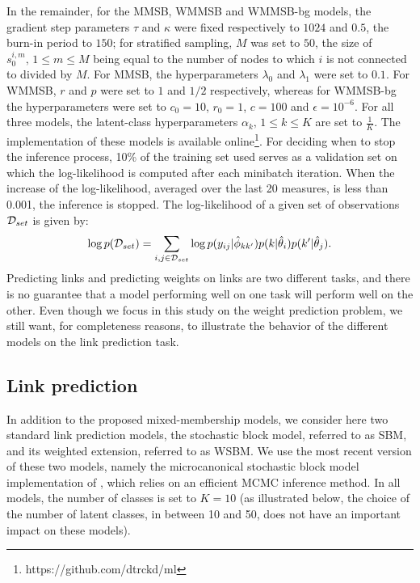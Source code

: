 In the remainder, for the MMSB, WMMSB and WMMSB-bg models, the gradient step parameters  $\tau$ and $\kappa$ were fixed respectively to  $1024$ and $0.5$, the burn-in period to $150$; for stratified sampling, $M$ was set to $50$, the size of $s_0^{i,m}, \, 1 \le m \le M$ being equal to the number of nodes to which $i$ is not connected to divided by $M$. For MMSB, the hyperparameters $\lambda_0$ and $\lambda_1$ were set to $0.1$. For WMMSB, $r$ and $p$ were set to $1$ and $1/2$ respectively, whereas for WMMSB-bg the hyperparameters were set to  $c_0=10$, $r_0=1$, $c=100$ and $\epsilon=10^{-6}$. For all three models, the latent-class hyperparameters $\alpha_k, \, 1 \le k \le K$ are set to $\frac{1}{K}$. The implementation of these models is available online\footnote{https://github.com/dtrckd/ml}. For deciding when to stop the inference process, 10\% of the training set used serves as a validation set on which the log-likelihood is computed after each minibatch iteration. When the increase of the log-likelihood, averaged over the last 20 measures, is less than 0.001, the inference is stopped. The log-likelihood of a given set of observations $\mathcal{D}_{set}$  is given by:
%
\begin{align*}
\log p(\mathcal{D}_{set}) = \sum_{i,j \in \mathcal{D}_{set}} \log p(y_{ij} | \hat\phi_{kk'}) p(k|\hat\theta_i) p(k'|\hat\theta_j).
\end{align*}
%
Predicting links and predicting weights on links are two different tasks, and there is no guarantee that a model performing well on one task will perform well on the other. Even though we focus in this study on the weight prediction problem, we still want, for completeness reasons, to illustrate the behavior of the different models on the link prediction task.

\subsection{Link prediction}

\begin{table*}[ht]
\centering
	
\label{table:roc}
\end{table*}

In addition to the proposed mixed-membership models, we consider here two standard link prediction models, the stochastic block model, referred to as SBM, and its weighted extension, referred to as WSBM. We use the most recent version of these two models, namely the microcanonical stochastic block model implementation of \cite{peixoto2018nonparametric}, which relies on an efficient MCMC inference method. In all models, the number of classes is set to $K=10$ (as illustrated below, the choice of the number of latent classes, in between 10 and 50, does not have an important impact on these models).

